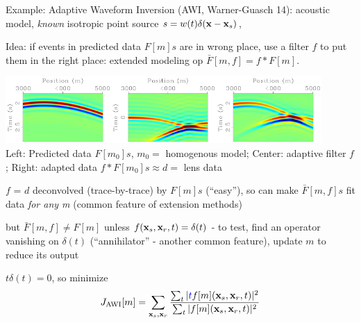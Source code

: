 \documentclass[xcolor=dvipsnames,12pt,aspectratio=169]{beamer}
\begin{document}
\begin{frame}
  \vspace{0.25in}
Example: Adaptive Waveform Inversion (AWI, Warner-Guasch 14): acoustic
model, {\em known} isotropic point source $s = w(t)\delta(\mathbf{x}-\mathbf{x}_s)$,

Idea: if events in predicted data $F[m]s$ are in wrong place, use a 
filter $f$ to put them in the right place: extended modeling op $\bar{F}[m,f] = f*F[m]$.
\vspace{-0.25in}
\begin{center}
  \includegraphics[height=1in]{Fig/ptph0half.pdf}\includegraphics[height=1in]{Fig/uest0half.pdf}\includegraphics[height=1in]{Fig/ptpl0half.pdf}\\
\vspace{0.5cm}
Left: Predicted data $F[m_0]s$, $m_0=$ homogenous model; Center: adaptive filter $f$;
Right: adapted data $f*F[m_0]s \approx d =$ lens data
\end{center}

\end{frame}
\begin{frame}
$f$ = $d$ deconvolved (trace-by-trace) by $F[m]s$ (``easy''), so can
make $\bar{F}[m,f]s$ fit data {\em for any m} (common feature of extension methods)

but $\bar{F}[m,f] \ne F[m]$ unless $f(\mathbf{x}_s,\mathbf{x}_r,t)=\delta(t)$ - to
test, find an operator vanishing on $\delta(t)$ (``annihilator'' -
another common feature), update $m$ to reduce its output

$t\delta(t)=0$, so minimize
\[
J_{\rm AWI}[m] = \sum_{\mathbf{x}_s,\mathbf{x}_r}\frac{{\sum_t|\color{blue}t}
  f[m](\mathbf{x}_s,\mathbf{x}_r,t)|^2}{\sum_{t}| f[m](\mathbf{x}_s,\mathbf{x}_r,t)|^2}
\]
\end{frame}
\end{document}
